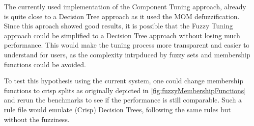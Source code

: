 The currently used implementation of the Component Tuning approach, already is quite close to a Decision Tree approach as it used the MOM defuzzification. Since this aproach showed good results, it is possible that the Fuzzy Tuning approach could be simplified to a Decision Tree approach without losing much performance. This would make the tuning process more transparent and easier to understand for users, as the complexity intrpduced by fuzzy sets and membership functions could be avoided.

To test this hypothesis using the current system, one could change membership functions to crisp splits as originally depicted in \autoref{fig:fuzzyMembershipFunctions} and rerun the benchmarks to see if the performance is still comparable. Such a rule file would emulate (Crisp) Decision Trees, following the same rules but without the fuzziness.